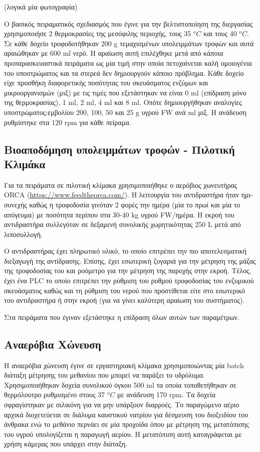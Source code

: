 \documentclass[11pt]{article}
\begin{document}
(λογικά μία φωτογραφία)

Ο βασικός πειραματικός σχεδιασμός που έγινε για την βελτιστοποίηση της διεργασίας χρησιμοποιήσε 2 θερμοκρασίες της μεσόφιλης περιοχής, τους 35 \(^oC\) και τους 40 \(^oC\). Σε κάθε δοχείο τροφοδοτήθηκαν 200 g τεμαχισμένων υπολειμμάτων τροφών και αυτά αραιώθηκαν με 600 ml νερό. Η αραίωση αυτή επιλέχθηκε μετά από κάποια προπαρασκευαστικά πειράματα ως μία τιμή στην οποία πετυχαίνεται καλή ομοιογένια του υποστρώματος και τα στερεά δεν δημιουργούν κάποιο πρόβλημα. Κάθε δοχείο είχε προσθήκη διαφορετικής ποσότητας του σκευάσματος ενζύμων και μικροοργανισμών (μιξ) με τις τιμές που εξετάστηκαν να είναι 0 ml (επίδραση μόνο της θερμοκρασίας), 1 ml, 2 ml, 4 ml και 8 ml. Οπότε δημιουργήθηκαν αναλογίες υποστρώματος:εμβολίου 200, 100, 50 και 25 g υγρού FW ανά ml μιξ. Η ανάδευση ρυθμίστηκε στα 120 rpm για κάθε πείραμα.

\subsection{Βιοαποδόμηση υπολειμμάτων τροφών - Πιλοτική Κλιμάκα}
\label{sec:org55f640a}
Για τα πειράματα σε πιλοτική κλίμακα χρησιμοποιήθηκε ο αερόβιος χωνευτήρας ORCA (\url{https://www.feedtheorca.com/}). Η λειτουργία του αντιδραστήρα ήταν ημι-συνεχής καθώς η τροφοδοσία γινόταν 2 φορές την ημέρα (μία το πρωί και μία το απόγευμα) με ποσότητα περίπου στα 30-40 kg υγρού FW/ημέρα. Η εκροή του αντιδραστήρα συλλεγόταν σε δεξαμενή συνολικής χωρητικότητας 250 L μετά από λιποσυλλογή.

Ο αντιδραστήρας έχει πληρωτικό υλικό, το οποίο επιτρέπει την πιο αποτελεσματική διεξαγωγή της αντίδρασης. Επίσης, έχει εσωτερική ζυγαριά για την μέτρηση της μάζας της τροφοδοσίας του και ροόμετρο για την μέτρηση της παροχής στην εκροή. Τέλος, έχει ένα PLC το οποίο επιτρέπει την ρύθμιση του ρυθμού τροφοδοσίας του ενζυμικού σκευάσματος καθώς και τη ρύθμιση του νερού που προστίθεται είτε στο εσωτερικό του αντιδραστήρα ή στην εκροή (για να γίνει καλύτερη αραίωση του συστήματος).

Στα πειράματα που έγιναν εξετάστηκε η επίδραση όλων αυτών των παραμέτρων.

\subsection{Αναερόβια Χώνευση}
\label{sec:orgb9e7f92}
Η αναερόβια χώνευση έγινε σε εργαστηριακή κλίμακα χρησιμοποιώντας μία batch διάταξη μέτρησης του μεθανίου που μπορεί να παράξει το υδρόλυμα. Χρησιμοποιήθηκαν δοχεία συνολικού όγκου 500 ml τα οποία τοποθετήθηκαν σε θερμόλουτρο ρυθμισμένο στους 37 \(^oC\) με ανάδευση 170 rpm. Τα δοχεία σφραγίστηκαν με σιλικόνη για να μην υπάρξουν διαρροές. Το παραγώμενο αέριο αρχικά διοχετεύεται σε διάλυμα καυστικού νατρίου για δέσμευση του διοξειδίου του άνθρακα ενώ το μεθάνιο περνάει σε μία προχοίδα όπου με μέτρηση της μετατόπισης του υγρού υπολογίζεται η παραγωγή αερίου. Η μετατόπιση αυτή καταγράφεται με χρήση κάμερας που υπάρχει στην διάταξη.
\end{document}
